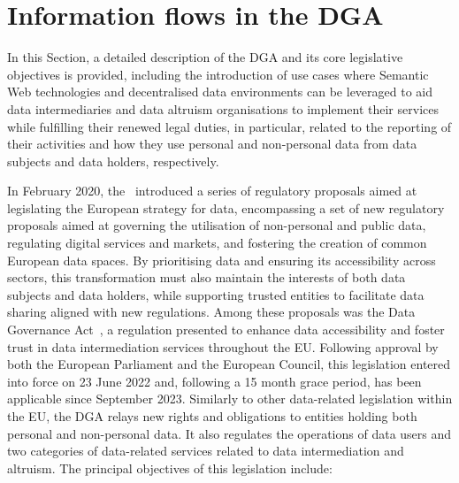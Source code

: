 \section{Information flows in the DGA}
\label{sec:dga_flows}

In this Section, a detailed description of the DGA and its core legislative objectives is provided, including the introduction of use cases where Semantic Web technologies and decentralised data environments can be leveraged to aid data intermediaries and data altruism organisations to implement their services while fulfilling their renewed legal duties, in particular, related to the reporting of their activities and how they use personal and non-personal data from data subjects and data holders, respectively.

In February 2020, the~\cite{european_commission_communication_2020} introduced a series of regulatory proposals aimed at legislating the European strategy for data, encompassing a set of new regulatory proposals aimed at governing the utilisation of non-personal and public data, regulating digital services and markets, and fostering the creation of common European data spaces.
By prioritising data and ensuring its accessibility across sectors, this transformation must also maintain the interests of both data subjects and data holders, while supporting trusted entities to facilitate data sharing aligned with new regulations.
Among these proposals was the Data Governance Act~\citeyearpar{noauthor_regulation_2022}, a regulation presented to enhance data accessibility and foster trust in data intermediation services throughout the EU.
Following approval by both the European Parliament and the European Council, this legislation entered into force on 23 June 2022 and, following a 15 month grace period, has been applicable since September 2023.
Similarly to other data-related legislation within the EU, the DGA relays new rights and obligations to entities holding both personal and non-personal data.
It also regulates the operations of data users and two categories of data-related services related to data intermediation and altruism.
The principal objectives of this legislation include:

